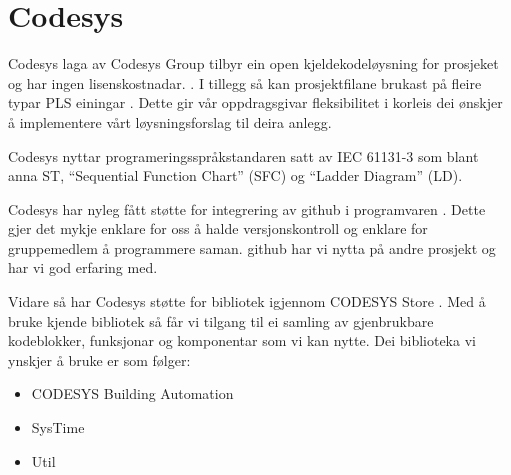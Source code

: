 \section{Codesys}
\thispagestyle{fancy}
Codesys \citep{Codesys} laga av Codesys Group tilbyr ein open kjeldekodeløysning for prosjeket og har ingen lisenskostnadar. \citep{CodesysLisens}. 
I tillegg så kan prosjektfilane brukast på fleire typar PLS einingar \citep{CodesysPLS}. 
Dette gir vår oppdragsgivar fleksibilitet i korleis dei ønskjer å implementere vårt løysningsforslag til deira anlegg.

Codesys nyttar programeringsspråkstandaren satt av \gls{IEC} 61131-3 som blant anna \gls{ST}, ``Sequential Function Chart'' (\gls{SFC}) og ``Ladder Diagram'' (\gls{LD}). 

Codesys har nyleg fått støtte for integrering av \gls{github} i programvaren \citep{CodesysGIT}. 
Dette gjer det mykje enklare for oss å halde versjonskontroll
og enklare for gruppemedlem å programmere saman. 
\gls{github} har vi nytta på andre prosjekt og har vi god erfaring med.

Vidare så har Codesys støtte for bibliotek igjennom CODESYS Store \citep{CodesysStore}. 
Med å bruke kjende bibliotek så får vi tilgang til ei samling av gjenbrukbare kodeblokker, funksjonar og komponentar som vi kan nytte.
Dei biblioteka vi ynskjer å bruke er som følger:

\begin{itemize}
    \item CODESYS Building Automation \citep{BuildingAutomation}
    \item SysTime \citep{DateAndTime}
    \item Util \citep{Util}
\end{itemize}


\newpage
